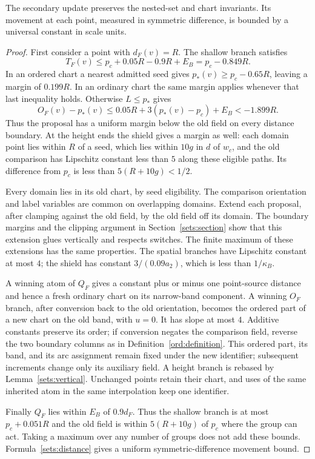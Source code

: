 \begin{lemma}\label{sec:validity}
The secondary update preserves the nested-set and chart invariants.
Its movement at each point, measured in symmetric difference, is bounded
by a universal constant in scale units.
\end{lemma}
\begin{proof}
First consider a point with $d_F(v)=R$. The shallow branch satisfies
\[
 T_F(v)\le p_c+0.05R-0.9R+E_B=p_c-0.849R.
\]
In an ordered chart a nearest admitted seed gives
$p_*(v)\ge p_c-0.65R$, leaving a margin of $0.199R$.
In an ordinary chart the same margin applies whenever that last
inequality holds. Otherwise $L\le p_*$ gives
\[
 O_F(v)-p_*(v)
 \le0.05R+3(p_*(v)-p_c)+E_B<-1.899R.
\]
Thus the proposal has a uniform margin below the old field on every
distance boundary. At the height ends the shield gives a margin as well:
each domain point lies within $R$ of a seed, which lies within $10g$ in
$d$ of $w_c$, and the old comparison has Lipschitz constant less than $5$
along these eligible paths. Its difference from $p_c$ is less than
$5(R+10g)<1/2$.

Every domain lies in its old chart, by seed eligibility. The comparison
orientation and label variables are common on overlapping domains.
Extend each proposal, after clamping against the old field, by the old
field off its domain. The boundary margins and the clipping argument in
Section~\ref{sets:section} show that this extension glues vertically and
respects switches. The finite maximum of these extensions has the same
properties. The spatial branches have Lipschitz constant at most $4$;
the shield has constant $3/(0.09a_2)$, which is less than $1/\kappa_B$.

A winning atom of $Q_F$ gives a constant plus or minus one point-source
distance and hence a fresh ordinary chart on its narrow-band component.
A winning $O_F$ branch, after conversion back to the old orientation,
becomes the ordered part of a new chart on the old band, with $u=0$.
It has slope at most $4$. Additive constants preserve its order; if
conversion negates the comparison field, reverse the two boundary
columns as in Definition~\ref{ord:definition}. This ordered part, its
band, and its arc assignment remain fixed under the new identifier;
subsequent increments change only its auxiliary field.
A height branch is rebased by
Lemma~\ref{sets:vertical}. Unchanged points retain their chart, and uses
of the same inherited atom in the same interpolation keep one identifier.

Finally $Q_F$ lies within $E_B$ of $0.9d_F$. Thus the shallow branch is
at most $p_c+0.051R$ and the old field is within $5(R+10g)$ of $p_c$
where the group can act. Taking a maximum over any number of groups does
not add these bounds. Formula~\eqref{sets:distance} gives a uniform
symmetric-difference movement bound.
\end{proof}

